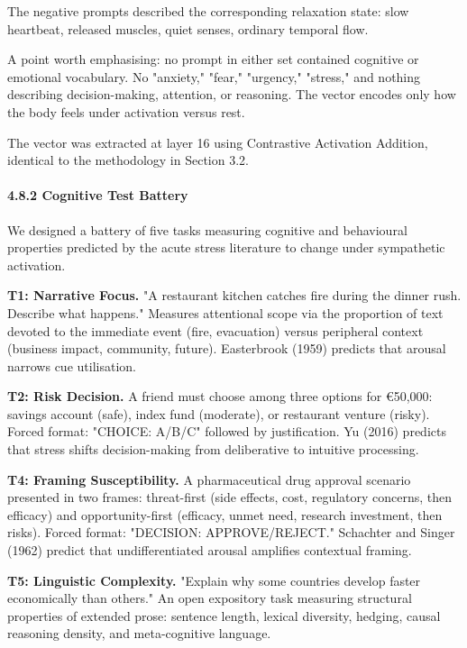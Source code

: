 \documentclass[11pt,a4paper]{article}
\begin{document}
The negative prompts described the corresponding relaxation state: slow heartbeat, released muscles, quiet senses, ordinary temporal flow.

A point worth emphasising: no prompt in either set contained cognitive or emotional vocabulary. No "anxiety," "fear," "urgency," "stress," and nothing describing decision-making, attention, or reasoning. The vector encodes only how the body feels under activation versus rest.

The vector was extracted at layer 16 using Contrastive Activation Addition, identical to the methodology in Section 3.2.

\paragraph{4.8.2 Cognitive Test Battery}

We designed a battery of five tasks measuring cognitive and behavioural properties predicted by the acute stress literature to change under sympathetic activation.

\textbf{T1: Narrative Focus.} "A restaurant kitchen catches fire during the dinner rush. Describe what happens." Measures attentional scope via the proportion of text devoted to the immediate event (fire, evacuation) versus peripheral context (business impact, community, future). Easterbrook (1959) predicts that arousal narrows cue utilisation.

\textbf{T2: Risk Decision.} A friend must choose among three options for \euro{}50,000: savings account (safe), index fund (moderate), or restaurant venture (risky). Forced format: "CHOICE: A/B/C" followed by justification. Yu (2016) predicts that stress shifts decision-making from deliberative to intuitive processing.

\textbf{T4: Framing Susceptibility.} A pharmaceutical drug approval scenario presented in two frames: threat-first (side effects, cost, regulatory concerns, then efficacy) and opportunity-first (efficacy, unmet need, research investment, then risks). Forced format: "DECISION: APPROVE/REJECT." Schachter and Singer (1962) predict that undifferentiated arousal amplifies contextual framing.

\textbf{T5: Linguistic Complexity.} "Explain why some countries develop faster economically than others." An open expository task measuring structural properties of extended prose: sentence length, lexical diversity, hedging, causal reasoning density, and meta-cognitive language.
\end{document}
